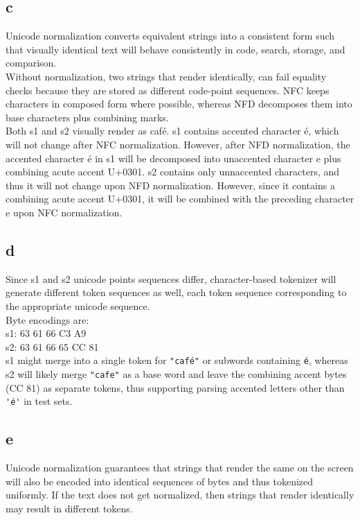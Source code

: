 \documentclass{article}
\numberwithin{equation}{section}
\begin{document}
    \subsection*{c}
    Unicode normalization converts equivalent strings into a consistent form such that visually identical text will behave
    consistently in code, search, storage, and comparison. \\
    Without normalization, two strings that render identically, can fail equality checks because they are stored as different code-point sequences.
    NFC keeps characters in composed form where possible, whereas NFD decomposes them into base characters plus combining marks.\\
    Both s1 and s2 visually render as café.
    s1 contains accented character é, which will not change after NFC normalization.
    However, after NFD normalization, the accented character é in s1 will be decomposed into unaccented character
    e plus combining acute accent U+0301.
    s2 contains only unnaccented characters, and thus it will not change upon NFD normalization.
    However, since it contains a combining acute accent U+0301, it will be combined with the preceding character e
    upon NFC normalization.


    \subsection*{d}
    Since s1 and s2 unicode points sequences differ, character-based tokenizer will generate different token
    sequences as well, each token sequence corresponding to the appropriate unicode sequence. \\

    Byte encodings are: \\
    s1: 63 61 66 C3 A9 \\
    s2: 63 61 66 65 CC 81\\

    s1 might merge into a single token for \verb|"café"| or subwords containing \verb|é|, whereas s2
    will likely merge \verb|"cafe"| as a base word and leave the combining
    accent bytes (CC 81) as separate tokens, thus supporting parsing accented
    letters other than \verb|'é'| in test sets.


    \subsection*{e}
    Unicode normalization guarantees that strings that render the same on the screen will
    also be encoded into identical sequences of bytes and thus tokenized uniformly.
    If the text does not get normalized, then strings that render identically may
    result in different tokens.
\end{document}
